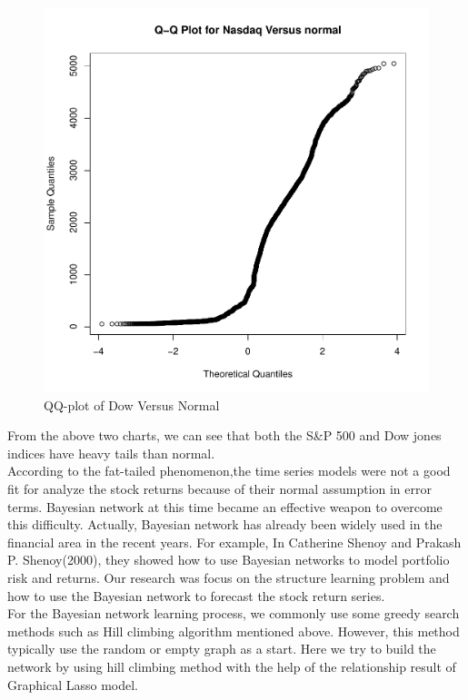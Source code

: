 \documentclass[12pt]{article}
\theoremstyle{plain}
\begin{document}
\begin{figure}[!htb]
\centering
\includegraphics[scale=0.50]{nasdaq.pdf}
\caption{\label{graph:pdf1} QQ-plot of Dow Versus Normal}
\end{figure}

From the above two charts, we can see that both the S\&P 500 and Dow jones indices have heavy tails than normal. \\
 According to the fat-tailed phenomenon,the time series models were not a good fit for analyze the stock returns because of their normal assumption in error terms. Bayesian network at this time became an effective weapon to overcome this difficulty. Actually, Bayesian network has already been widely used in the financial area in the recent years. For example, In Catherine Shenoy and Prakash P. Shenoy(2000), they showed how to use Bayesian networks to model portfolio risk and returns. Our research was focus on  the structure learning problem and how to use the Bayesian network to forecast the stock return series.\\
 For the Bayesian network learning process, we commonly use some greedy search methods such as Hill climbing algorithm mentioned above. However, this method typically use the random or empty graph as a start. Here we try to build the network by using hill climbing method with the help of the relationship result of Graphical Lasso model. \\
 
\end{document}
